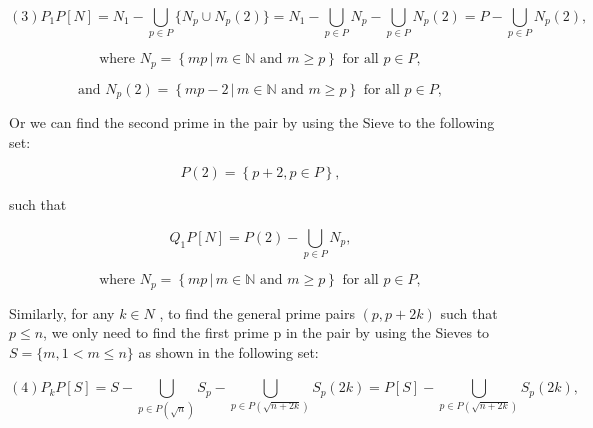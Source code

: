 \documentclass{aomart}
\begin{document}
\begin{equation}
\left(3\right)         P_{1}P\left[N\right] = N_{1} -  \bigcup_{p\in P}^{} \{  N_{p}\cup  N_{p}(2)\}  = N_{1}- \bigcup_{p\in P}^{} N_{p}- \bigcup_{p\in P}^{}  N_{p}(2) = P- \bigcup_{p\in P}^{}  N_{p}(2), 
\end{equation}

\begin{equation}
\text{where } N_{p} = \left\{ mp \, | \, m \in \mathbb{N} \text{ and } m \geq p \right\} \text{ for all } p \in P,
\end{equation}

\begin{equation}
\text{and } N_{p}(2) = \left\{ mp-2 \, | \, m \in \mathbb{N} \text{ and } m \geq p \right\} \text{ for all } p \in P,
\end{equation}
\vspace{1\baselineskip}


Or we can find the second prime in the pair by using the Sieve to the following set: 

\begin{equation}
P(2) =\left\{  p+2,  p\in P\right\}  ,
\end{equation}



such that            

\begin{equation}
Q_{1}P[N] = P(2) - \bigcup_{p \in P} N_{p},
\end{equation}

\begin{equation}
\text{where } N_{p} = \left\{ mp \, | \, m \in \mathbb{N} \text{ and } m \geq p \right\} \text{ for all } p \in P,
\end{equation}

\vspace{1\baselineskip}

Similarly, for any \( k\in N\) {, to find the} general prime pairs \( (p,  p+2k)\) such that \( p\leq n\), we only need to find the first prime p in the pair by using  {the Sieves to }\( S = \{ m,  1<m\leq n\}\) as shown in the following set:

\begin{equation}
\left(4\right)                P_{k}P\left[S\right] =  S- \bigcup_{p\in P\left(\sqrt{n}\right)}^{} S_{p} - \bigcup_{p\in P\left(\sqrt{n+2k}\right)}^{}S_{p}\left(2k\right) =  P\left[S\right]- \bigcup_{p\in P\left(\sqrt{n+2k}\right)}^{}S_{p}\left(2k\right),
\end{equation}
\end{document}
